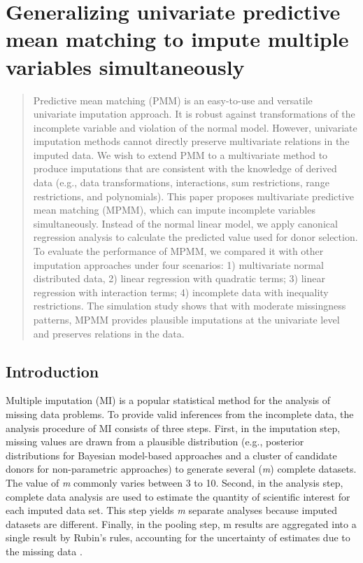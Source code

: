 \chapter{Generalizing univariate predictive mean matching to impute multiple variables simultaneously}
\label{chap3}
	\begin{abstract}
		Predictive mean matching (PMM) is an easy-to-use and versatile univariate imputation approach. It is robust against transformations of the incomplete variable and violation of the normal model. However, univariate imputation methods cannot directly preserve multivariate relations in the imputed data. We wish to extend PMM to a multivariate method to produce imputations that are consistent with the knowledge of derived data (e.g., data transformations, interactions, sum restrictions, range restrictions, and polynomials). This paper proposes multivariate predictive mean matching (MPMM), which can impute incomplete variables simultaneously. Instead of the normal linear model, we apply canonical regression analysis to calculate the predicted value used for donor selection. To evaluate the performance of MPMM, we compared it with other imputation approaches under four scenarios: 1) multivariate normal distributed data, 2) linear regression with quadratic terms; 3) linear regression with interaction terms; 4) incomplete data with inequality restrictions. The simulation study shows that with moderate missingness patterns, MPMM provides plausible imputations at the univariate level and preserves relations in the data.   
	\end{abstract}

	\section{Introduction}
	\label{sec:3.1}
	Multiple imputation (MI) is a popular statistical method for the analysis of missing data problems. To provide valid inferences from the incomplete data, the analysis procedure of MI consists of three steps. First, in the imputation step, missing values are drawn from a plausible distribution (e.g., posterior distributions for Bayesian model-based approaches and a cluster of candidate donors for non-parametric approaches) to generate several (\emph{m}) complete datasets. The value of \emph{m} commonly varies between 3 to 10. Second, in the analysis step, complete data analysis are used to estimate the quantity of scientific interest for each imputed data set. This step yields \emph{m} separate analyses because imputed datasets are different. Finally, in the pooling step, m results are aggregated into a single result by Rubin’s rules, accounting for the uncertainty of estimates due to the missing data \citep[p.76]{RubinD1987}. 
	
